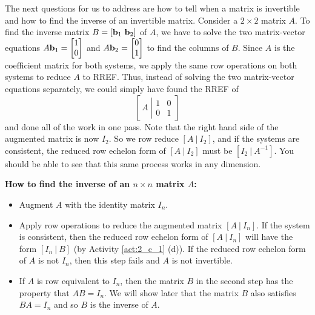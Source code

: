 \label{sec:mtx_inverse}

The next questions for us to address are how to tell when a matrix is invertible and how to find the inverse of an invertible matrix. Consider a $2 \times 2$ matrix $A$. To find the inverse matrix $B = [\vb_1 \ \vb_2]$ of $A$, we have to solve the two matrix-vector equations $A \mathbf{b}_1 = \begin{bmatrix}1 \\ 0 \end{bmatrix}$ and $A \mathbf{b}_2= \begin{bmatrix}0 \\1 \end{bmatrix}$ to find the columns of $B$. Since $A$ is the coefficient matrix for both systems, we apply the same row operations on both systems to reduce $A$ to RREF. Thus, instead of solving the two matrix-vector equations separately, we could simply have found the RREF of 
\[\left[\, A \ \left| \begin{array}{cc} 1 & 0 \\ 0 & 1 \end{array}\right. \right]\]
and done all of the work in one pass. Note that the right hand side of the augmented matrix is now $I_2$. So we row reduce $[A \ | \ I_2]$, and if the systems are consistent, the reduced row echelon form of $[A \ | \ I_2]$ must be $[I_2 \ | \ A^{-1}]$.  You should be able to see that this same process works in any dimension. 



\noindent \textbf{How to find the inverse of an $n \times n$ matrix $A$:}
\begin{itemize}
\item Augment $A$ with the identity matrix $I_n$.
\item Apply row operations to reduce the augmented matrix $[A \ | \ I_n]$. If the system is consistent, then the reduced row echelon form of $[A \ | \ I_n]$ will have the form $[I_n \ | \ B]$ (by Activity \ref{act:2_c_1} (d)). If the reduced row echelon form of $A$ is not $I_n$, then this step fails and $A$ is not invertible.
\item If $A$ is row equivalent to $I_n$, then the matrix $B$ in the second step has the property that $AB = I_n$. We will show later that the matrix $B$ also satisfies $BA = I_n$ and so $B$ is the inverse of $A$.
\end{itemize}



